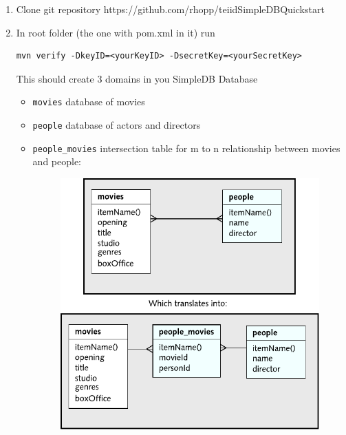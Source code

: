 \documentclass[oneside,12pt,final]{fithesis2}
\begin{document}
\begin{enumerate}
 \item Clone git repository https://github.com/rhopp/teiidSimpleDBQuickstart
 \item In root folder (the one with pom.xml in it) run
 \begin{Verbatim}[fontsize=\small]
mvn verify -DkeyID=<yourKeyID> -DsecretKey=<yourSecretKey>
 \end{Verbatim}
 This should create 3 domains in you SimpleDB Database
 \begin{itemize}
  \item \texttt{movies} database of movies
  \item \texttt{people} database of actors and directors
  \item \texttt{people\_movies} intersection table for m to n relationship between movies and people:
  \begin{figure}[h]
 \centering
 \includegraphics[scale=1]{exampleStructure}
\end{figure}
 \end{itemize}
 

\end{enumerate}
\end{document}
